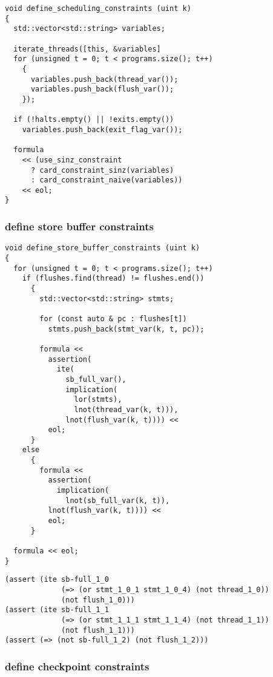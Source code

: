 \begin{lstlisting}[style=c++]
void define_scheduling_constraints (uint k)
{
  std::vector<std::string> variables;

  iterate_threads([this, &variables]
  for (unsigned t = 0; t < programs.size(); t++)
    {
      variables.push_back(thread_var());
      variables.push_back(flush_var());
    });

  if (!halts.empty() || !exits.empty())
    variables.push_back(exit_flag_var());

  formula
    << (use_sinz_constraint
      ? card_constraint_sinz(variables)
      : card_constraint_naive(variables))
    << eol;
}
\end{lstlisting}

\subsubsection{define store buffer constraints}

\begin{lstlisting}[style=c++]
void define_store_buffer_constraints (uint k)
{
  for (unsigned t = 0; t < programs.size(); t++)
    if (flushes.find(thread) != flushes.end())
      {
        std::vector<std::string> stmts;

        for (const auto & pc : flushes[t])
          stmts.push_back(stmt_var(k, t, pc));

        formula <<
          assertion(
            ite(
              sb_full_var(),
              implication(
                lor(stmts),
                lnot(thread_var(k, t))),
              lnot(flush_var(k, t)))) <<
          eol;
      }
    else
      {
        formula <<
          assertion(
            implication(
              lnot(sb_full_var(k, t)),
          lnot(flush_var(k, t)))) <<
          eol;
      }

  formula << eol;
}
\end{lstlisting}

\begin{lstlisting}[language=SMTLib]
(assert (ite sb-full_1_0
             (=> (or stmt_1_0_1 stmt_1_0_4) (not thread_1_0))
             (not flush_1_0)))
(assert (ite sb-full_1_1
             (=> (or stmt_1_1_1 stmt_1_1_4) (not thread_1_1))
             (not flush_1_1)))
(assert (=> (not sb-full_1_2) (not flush_1_2)))
\end{lstlisting}

\subsubsection{define checkpoint constraints}

